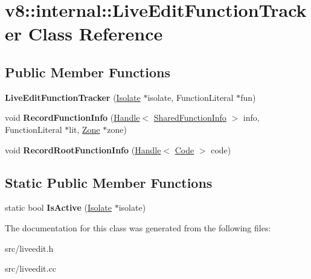 \hypertarget{classv8_1_1internal_1_1_live_edit_function_tracker}{}\section{v8\+:\+:internal\+:\+:Live\+Edit\+Function\+Tracker Class Reference}
\label{classv8_1_1internal_1_1_live_edit_function_tracker}
\subsection*{Public Member Functions}
\begin{DoxyCompactItemize}
\item 
\hypertarget{classv8_1_1internal_1_1_live_edit_function_tracker_a24d49343471b62692097605f18673b18}{}{\bfseries Live\+Edit\+Function\+Tracker} (\hyperlink{classv8_1_1internal_1_1_isolate}{Isolate} $\ast$isolate, Function\+Literal $\ast$fun)\label{classv8_1_1internal_1_1_live_edit_function_tracker_a24d49343471b62692097605f18673b18}

\item 
\hypertarget{classv8_1_1internal_1_1_live_edit_function_tracker_aa480f414b4f84b5f28efa32995321f4b}{}void {\bfseries Record\+Function\+Info} (\hyperlink{classv8_1_1internal_1_1_handle}{Handle}$<$ \hyperlink{classv8_1_1internal_1_1_shared_function_info}{Shared\+Function\+Info} $>$ info, Function\+Literal $\ast$lit, \hyperlink{classv8_1_1internal_1_1_zone}{Zone} $\ast$zone)\label{classv8_1_1internal_1_1_live_edit_function_tracker_aa480f414b4f84b5f28efa32995321f4b}

\item 
\hypertarget{classv8_1_1internal_1_1_live_edit_function_tracker_a4a815f4e09ba63ee536249f1cfc01b3e}{}void {\bfseries Record\+Root\+Function\+Info} (\hyperlink{classv8_1_1internal_1_1_handle}{Handle}$<$ \hyperlink{classv8_1_1internal_1_1_code}{Code} $>$ code)\label{classv8_1_1internal_1_1_live_edit_function_tracker_a4a815f4e09ba63ee536249f1cfc01b3e}

\end{DoxyCompactItemize}
\subsection*{Static Public Member Functions}
\begin{DoxyCompactItemize}
\item 
\hypertarget{classv8_1_1internal_1_1_live_edit_function_tracker_a5fdc8185d6ccf7a364ff0913e692c2ce}{}static bool {\bfseries Is\+Active} (\hyperlink{classv8_1_1internal_1_1_isolate}{Isolate} $\ast$isolate)\label{classv8_1_1internal_1_1_live_edit_function_tracker_a5fdc8185d6ccf7a364ff0913e692c2ce}

\end{DoxyCompactItemize}


The documentation for this class was generated from the following files\+:\begin{DoxyCompactItemize}
\item 
src/liveedit.\+h\item 
src/liveedit.\+cc\end{DoxyCompactItemize}
